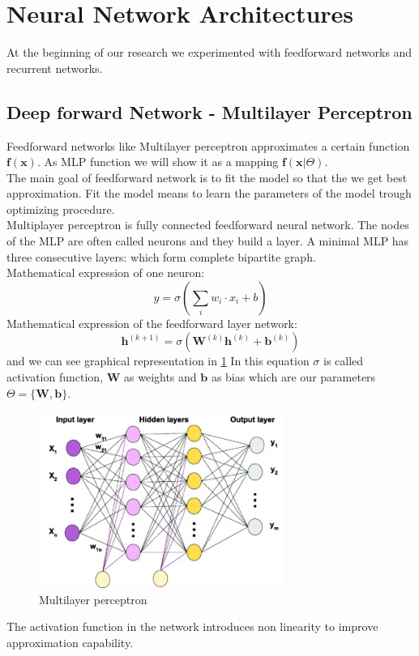 \section{Neural Network Architectures}
At the beginning of our research we experimented with feedforward networks and recurrent networks.  
\subsection{Deep forward Network - Multilayer Perceptron }
Feedforward networks like Multilayer perceptron approximates a certain function $\mathbf{f(\mathbf{x})}$. As MLP function we will show it as a mapping $\mathbf{f}(\mathbf{x}|\Theta)$.\\
The main goal of feedforward network is to fit the model so that the we get best approximation. Fit the model means to learn the parameters of the model trough optimizing procedure.\\
Multiplayer perceptron is fully connected feedforward neural network. The nodes of the MLP are often called neurons and they build a layer. A minimal MLP has three consecutive layers: which form complete bipartite graph.\\
Mathematical expression of one neuron:
\begin{equation}
	y = \sigma(\sum_i{w_i \cdot x_i} + b) 
\end{equation}
Mathematical expression of the feedforward layer network:
\begin{equation}
	\mathbf{h}^{(k+1)} =\sigma\left(\mathbf{W}^{(k)}\mathbf{h}^{(k)} + \mathbf{b}^{(k)}\right)
\end{equation} and we can see graphical representation in \ref{mlp}
In this equation $\sigma$ is called activation function, 
$\mathbf{W}$ as weights and $\mathbf{b}$ as bias which are our parameters $\Theta =\{\mathbf{W},\mathbf{b}\}$.\\
\begin{figure}[h!]
	\centering\includegraphics[width=8cm]{chapters/chapter2/mlp}
	\caption{Multilayer perceptron\cite{mlppic}}
	\label{mlp}
\end{figure}
The activation function in the network introduces non linearity to improve approximation capability.\\




